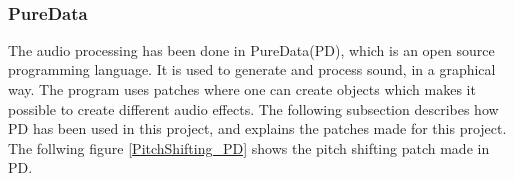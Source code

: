 \begin{minipage}{\linewidth}%
\label{middle_finger}
\end{minipage}\\

\subsubsection{PureData}

The audio processing has been done in PureData(PD)\citep{PD_Info}, which is an open source programming language. It is used to generate and process sound, in a graphical way. 
The program uses patches where one can create objects which makes it possible to create different audio effects. The following subsection describes how PD has been used in this project,
and explains the patches made for this project. \\

The follwing figure \ref{PitchShifting_PD} shows the pitch shifting patch made in PD. 


\begin{minipage}{\linewidth}%
\label{PitchShifting_PD}
\end{minipage}\\